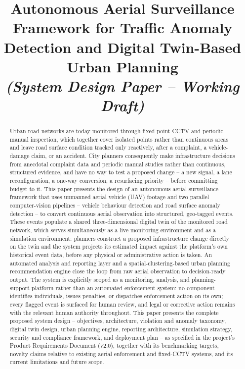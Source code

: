 \documentclass[conference]{IEEEtran}
\begin{document}
\title{Autonomous Aerial Surveillance Framework for Traffic Anomaly Detection and Digital Twin-Based Urban Planning\\
\large \textit{(System Design Paper -- Working Draft)}}

\author{
}

\maketitle

\begin{abstract}
Urban road networks are today monitored through fixed-point CCTV and periodic manual inspection, which together cover isolated points rather than continuous areas and leave road surface condition tracked only reactively, after a complaint, a vehicle-damage claim, or an accident. City planners consequently make infrastructure decisions from anecdotal complaint data and periodic manual studies rather than continuous, structured evidence, and have no way to test a proposed change -- a new signal, a lane reconfiguration, a one-way conversion, a resurfacing priority -- before committing budget to it. This paper presents the design of an autonomous aerial surveillance framework that uses unmanned aerial vehicle (UAV) footage and two parallel computer-vision pipelines -- vehicle behaviour detection and road surface anomaly detection -- to convert continuous aerial observation into structured, geo-tagged events. These events populate a shared three-dimensional digital twin of the monitored road network, which serves simultaneously as a live monitoring environment and as a simulation environment: planners construct a proposed infrastructure change directly on the twin and the system projects its estimated impact against the platform's own historical event data, before any physical or administrative action is taken. An automated analysis and reporting layer and a spatial-clustering-based urban planning recommendation engine close the loop from raw aerial observation to decision-ready output. The system is explicitly scoped as a monitoring, analysis, and planning-support platform rather than an automated enforcement system: no component identifies individuals, issues penalties, or dispatches enforcement action on its own; every flagged event is surfaced for human review, and legal or corrective action remains with the relevant human authority throughout. This paper presents the complete proposed system design -- objectives, architecture, violation and anomaly taxonomy, digital twin design, urban planning engine, reporting architecture, simulation strategy, security and compliance framework, and deployment plan -- as specified in the project's Product Requirements Document (v2.0), together with its benchmarking targets, novelty claims relative to existing aerial enforcement and fixed-CCTV systems, and its current limitations and future scope.
\end{abstract}
\end{document}
